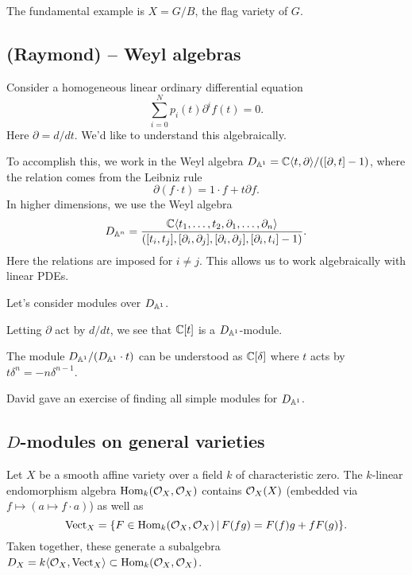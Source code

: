 \documentclass{article}
\begin{document}
\begin{ex}
	The fundamental example is $X = G / B$, the flag variety of $G$.
\end{ex}

\subsection{(Raymond) -- Weyl algebras}

Consider a homogeneous linear ordinary differential equation
\[
	\sum_{i=0}^N p_i(t) \partial^i f(t) = 0.
\]
Here $\partial = d/dt$.
We'd like to understand this algebraically.

To accomplish this, we work in the Weyl algebra $D_{\AA^1} = \CC\langle t, \partial \rangle / ([\partial, t] - 1)$, where the relation comes from the Leibniz rule
\[
	\partial (f \cdot t) = 1 \cdot f + t \partial f.
\]
In higher dimensions, we use the Weyl algebra
\[
	D_{\AA^n} = \frac{\CC\langle t_1, \dots, t_2, \partial_1, \dots, \partial_n \rangle}{([t_i, t_j], [\partial_i, \partial_j], [\partial_i, \partial_j], [\partial_i, t_i] - 1)}.
\]
Here the relations are imposed for $i \neq j$.
This allows us to work algebraically with linear PDEs.

Let's consider modules over $D_{\AA^1}$.

\begin{ex}
	Letting $\partial$ act by $d / dt$, we see that $\CC[t]$ is a $D_{\AA^1}$-module.
\end{ex}

\begin{ex}
	The module $D_{\AA^1} / (D_{\AA^1} \cdot t)$ can be understood as $\CC[\delta]$ where $t$ acts by $t \delta^n = -n \delta^{n-1}$.
\end{ex}

David gave an exercise of finding all simple modules for $D_{\AA^1}$.

\subsection{$D$-modules on general varieties}

Let $X$ be a smooth affine variety over a field $k$ of characteristic zero.
The $k$-linear endomorphism algebra $\Hom_k(\Oc_X, \Oc_X)$ contains $\Oc_X(X)$ (embedded via $f \mapsto (a \mapsto f \cdot a)$) as well as 
\[
	\Vectrm_X = \{ F \in \Hom_k(\Oc_X, \Oc_X) \,|\, F(fg) = F(f)g + f F(g) \}.
\]
Taken together, these generate a subalgebra $D_X = k\langle \Oc_X, \Vectrm_X\rangle \subset \Hom_k(\Oc_X, \Oc_X)$.
\end{document}
